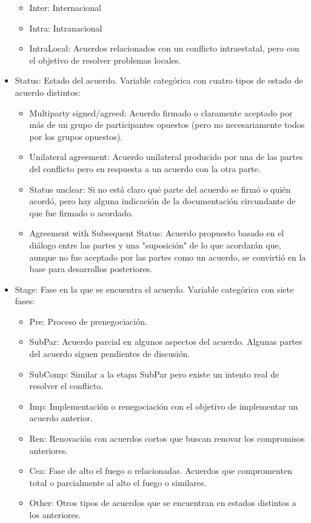 \documentclass[11pt]{article}
\providecommand{\tightlist}{%
      \setlength{\itemsep}{0pt}\setlength{\parskip}{0pt}}
\begin{document}
\begin{itemize}
  \begin{itemize}
  \item
    Inter: Internacional
  \item
    Intra: Intranacional
  \item
    IntraLocal: Acuerdos relacionados con un conflicto intraestatal,
    pero con el objetivo de resolver problemas locales.
  \end{itemize}
\item
  Status: Estado del acuerdo. Variable categórica con cuatro tipos de estado de
  acuerdo distintos:

  \begin{itemize}
  \tightlist
  \item
    Multiparty signed/agreed: Acuerdo firmado o claramente aceptado por
    más de un grupo de participantes opuestos (pero no necesariamente
    todos por los grupos opuestos).
  \item
    Unilateral agreement: Acuerdo unilateral producido por una de las partes del conflicto
    pero en respuesta a un acuerdo con la otra parte.
  \item
    Status unclear: Si no está claro qué parte del acuerdo se firmó o
    quién acordó, pero hay alguna indicación de la documentación
    circundante de que fue firmado o acordado.
  \item
    Agreement with Subsequent Status: Acuerdo propuesto basado en el
    diálogo entre las partes y una "suposición" de lo que acordarán que,
    aunque no fue aceptado por las partes como un acuerdo, se convirtió en
    la base para desarrollos posteriores.
  \end{itemize}
\item
  Stage: Fase en la que se encuentra el acuerdo. Variable categórica con
  siete fases:

  \begin{itemize}
  \tightlist
  \item
    Pre: Proceso de prenegociación.
  \item
    SubPar: Acuerdo parcial en algunos aspectos del acuerdo. Algunas
    partes del acuerdo siguen pendientes de discusión.
  \item
    SubComp: Similar a la etapa SubPar pero existe un intento real de
    resolver el conflicto.
  \item
    Imp: Implementación o renegociación con el objetivo de implementar
    un acuerdo anterior.
  \item
    Ren: Renovación con acuerdos cortos que buscan renovar los
    compromisos anteriores.
  \item
    Cea: Fase de alto el fuego o relacionadas. Acuerdos que compromenten
    total o parcialmente al alto el fuego o similares.
  \item
    Other: Otros tipos de acuerdos que se encuentran en estados
    distintos a los anteriores.
  \end{itemize}
\end{itemize}
\end{document}
